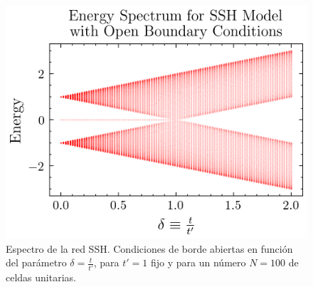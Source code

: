 \begin{figure}[h]
\centering	\includegraphics[width=0.7\linewidth]{media/ssh-open}
	\caption[Espectro de la red SSH.]{Espectro de la red SSH. Condiciones de borde abiertas en función del parámetro $\delta=\frac{t}{t'}$, para $t'=1$ fijo y para un número $N=100$ de celdas unitarias.
	\label{fig:ssh-open}}
\end{figure} 


